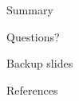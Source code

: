\documentclass[10pt]{beamer}
\newcommand{\themename}{\textbf{\textsc{metropolis}}\xspace}
\begin{document}
\begin{CJK*}{UTF8}{gbsn}
\begin{frame}{Summary}





\end{frame}

{
\begin{frame}[standout]
  Questions?
\end{frame}
}

\appendix

\begin{frame}[fragile]{Backup slides}


\end{frame}

\begin{frame}[allowframebreaks]{References}




\end{frame}


\end{CJK*}
\end{document}
